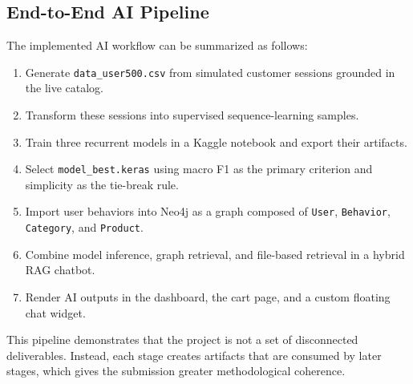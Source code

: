 \documentclass[12pt,a4paper]{article}
\begin{document}
\subsection{End-to-End AI Pipeline}
The implemented AI workflow can be summarized as follows:
\begin{enumerate}[label=\arabic*.]
  \item Generate \texttt{data\_user500.csv} from simulated customer sessions grounded in the live catalog.
  \item Transform these sessions into supervised sequence-learning samples.
  \item Train three recurrent models in a Kaggle notebook and export their artifacts.
  \item Select \texttt{model\_best.keras} using macro F1 as the primary criterion and simplicity as the tie-break rule.
  \item Import user behaviors into Neo4j as a graph composed of \texttt{User}, \texttt{Behavior}, \texttt{Category}, and \texttt{Product}.
  \item Combine model inference, graph retrieval, and file-based retrieval in a hybrid RAG chatbot.
  \item Render AI outputs in the dashboard, the cart page, and a custom floating chat widget.
\end{enumerate}

This pipeline demonstrates that the project is not a set of disconnected deliverables. Instead, each stage creates artifacts that are consumed by later stages, which gives the submission greater methodological coherence.
\end{document}
